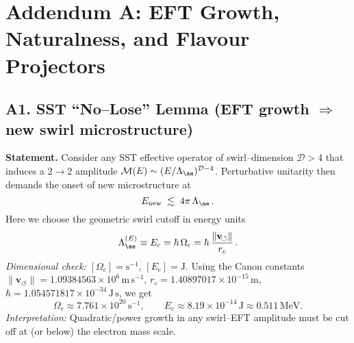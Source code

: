 \documentclass[11pt]{article}
\begin{document}
  \titlepageOpen

  \begin{abstract}


  \end{abstract}

  \titlepageClose
  \fi

  \ifdefined\standalonechapter
  \section{\papertitle}
  \else
  \fi


  \section*{Addendum A: EFT Growth, Naturalness, and Flavour Projectors}

      \subsection*{A1. SST ``No–Lose'' Lemma (EFT growth $\Rightarrow$ new swirl microstructure)}
          \textbf{Statement.} Consider any SST effective operator of swirl–dimension $\mathcal D>4$ that induces a $2\!\to\!2$ amplitude
          $\mathcal M(E)\sim (E/\Lambda_{\ae})^{\mathcal D-4}$. Perturbative unitarity then demands the onset of new microstructure at
          \[
              E_{\text{new}} \;\lesssim\; 4\pi\, \Lambda_{\ae}\, .
          \]
          Here we choose the geometric swirl cutoff in energy units
          \[
              \Lambda_{\ae}^{(E)} \equiv E_c
              = \hbar\,\Omega_c
              = \hbar\, \frac{\|\mathbf v_{\!\circlearrowleft}\|}{r_c}\, .
          \]
          \textit{Dimensional check:} $[\Omega_c]=\mathrm{s}^{-1}$,\; $[E_c]=\mathrm{J}$. Using the Canon constants
          $\|\mathbf v_{\!\circlearrowleft}\|=1.09384563\times10^{6}\,\mathrm{m\,s^{-1}}$, $r_c=1.40897017\times10^{-15}\,\mathrm{m}$, $\hbar=1.054571817\times10^{-34}\,\mathrm{J\,s}$, we get
          \[
              \Omega_c\approx7.761\times10^{20}\,\mathrm{s}^{-1},\qquad
              E_c\approx8.19\times10^{-14}\,\mathrm{J}\approx0.511\,\mathrm{MeV}.
          \]
          \textit{Interpretation:} Quadratic/power growth in any swirl–EFT amplitude must be cut off at (or below) the electron mass scale.
\end{document}
